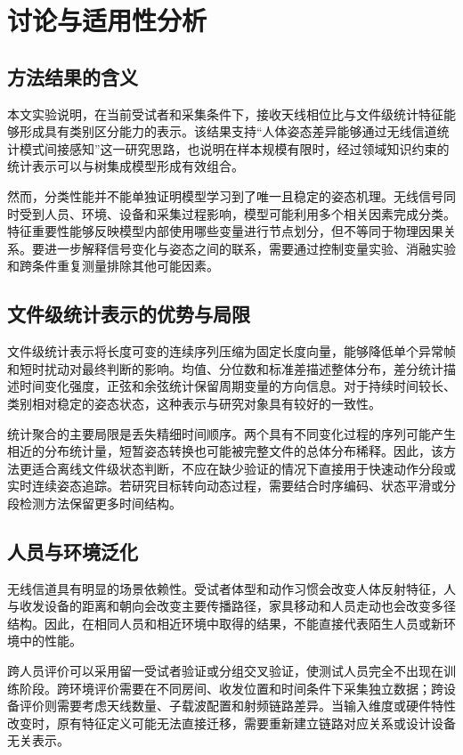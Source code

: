 
\chapter{讨论与适用性分析}
\label{chap:discussion}

\section{方法结果的含义}
本文实验说明，在当前受试者和采集条件下，接收天线相位比与文件级统计特征能够形成具有类别区分能力的表示。该结果支持“人体姿态差异能够通过无线信道统计模式间接感知”这一研究思路，也说明在样本规模有限时，经过领域知识约束的统计表示可以与树集成模型形成有效组合。

然而，分类性能并不能单独证明模型学习到了唯一且稳定的姿态机理。无线信号同时受到人员、环境、设备和采集过程影响，模型可能利用多个相关因素完成分类。特征重要性能够反映模型内部使用哪些变量进行节点划分，但不等同于物理因果关系。要进一步解释信号变化与姿态之间的联系，需要通过控制变量实验、消融实验和跨条件重复测量排除其他可能因素。

\section{文件级统计表示的优势与局限}
文件级统计表示将长度可变的连续序列压缩为固定长度向量，能够降低单个异常帧和短时扰动对最终判断的影响。均值、分位数和标准差描述整体分布，差分统计描述时间变化强度，正弦和余弦统计保留周期变量的方向信息。对于持续时间较长、类别相对稳定的姿态状态，这种表示与研究对象具有较好的一致性。

统计聚合的主要局限是丢失精细时间顺序。两个具有不同变化过程的序列可能产生相近的分布统计量，短暂姿态转换也可能被完整文件的总体分布稀释。因此，该方法更适合离线文件级状态判断，不应在缺少验证的情况下直接用于快速动作分段或实时连续姿态追踪。若研究目标转向动态过程，需要结合时序编码、状态平滑或分段检测方法保留更多时间结构。

\section{人员与环境泛化}
无线信道具有明显的场景依赖性。受试者体型和动作习惯会改变人体反射特征，人与收发设备的距离和朝向会改变主要传播路径，家具移动和人员走动也会改变多径结构。因此，在相同人员和相近环境中取得的结果，不能直接代表陌生人员或新环境中的性能。

跨人员评价可以采用留一受试者验证或分组交叉验证，使测试人员完全不出现在训练阶段。跨环境评价需要在不同房间、收发位置和时间条件下采集独立数据；跨设备评价则需要考虑天线数量、子载波配置和射频链路差异。当输入维度或硬件特性改变时，原有特征定义可能无法直接迁移，需要重新建立链路对应关系或设计设备无关表示。

